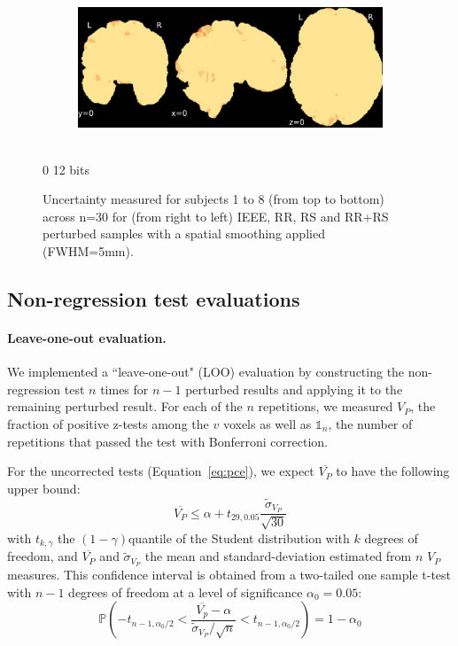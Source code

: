 \documentclass{article}
\begin{document}
\begin{landscape}
\begin{figure}
\begin{subfigure}[t]{0.2\paperheight}
        \end{subfigure}
        \begin{subfigure}[t]{0.2\paperheight}
            \centering
            \includegraphics[width=\textwidth]{figures/sig/fwhm_5/rr.rs_ds002338_sub-xp207_sig.pdf}
        \end{subfigure} \\
        \hspace*{6cm} 0  12 bits
        \caption{Uncertainty measured for subjects 1 to 8 (from top to bottom) across n=30 for
            (from right to left) IEEE, RR, RS and RR+RS perturbed samples with a spatial smoothing applied (FWHM=5mm). }
        \label{fig:uncertainty_sub_1}

    \end{figure}
\end{landscape}


\subsection{Non-regression test evaluations}

\paragraph{Leave-one-out evaluation.} We implemented a ``leave-one-out" (LOO)
evaluation by constructing the non-regression test $n$ times for $n-1$ perturbed results
and applying it to the remaining perturbed result. For each of the $n$ repetitions,
we measured $V_P$, the fraction of
positive z-tests among the $v$ voxels as well as $\mathds{1}_n$, the number of repetitions
that passed the test with Bonferroni correction.

For the uncorrected tests (Equation~\ref{eq:pce}), we expect $\overline{V_P}$ to have
the following upper bound:
\[
    \overline{V_P} \leq
    \alpha  + t_{29,0.05} \frac{\tilde{\sigma}_{V_P}}{\sqrt{30}}
\]
with
$t_{k,\gamma}$ the $(1-\gamma)$quantile of the Student distribution with $k$ degrees of freedom,
and $\overline{V_P}$ and $\tilde{\sigma}_{V_P}$ the mean and standard-deviation estimated from
$n$ $V_P$ measures.
This confidence interval is obtained from a two-tailed one sample
t-test with $n-1$ degrees of freedom at a level of significance $\alpha_0=0.05$:
\[
    \mathbb{P}
    \left(
    -t_{n-1,\alpha_0/2}
    <
    \dfrac{\overline{V_p} - \alpha}{\tilde{\sigma}_{V_P} / \sqrt{n}}
    <
    t_{n-1,\alpha_0/2}
    \right)
    = 1 - \alpha_0
\]
\end{document}
